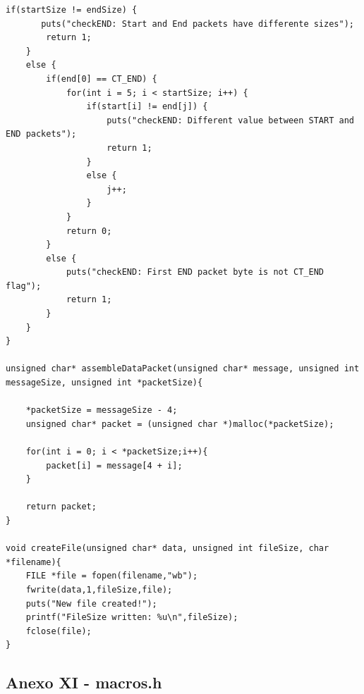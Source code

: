 \documentclass[11pt]{article}
\begin{document}
\begin{lstlisting}[style=CStyle]
    if(startSize != endSize) {
       puts("checkEND: Start and End packets have differente sizes");
        return 1;
    }
    else {
        if(end[0] == CT_END) {
            for(int i = 5; i < startSize; i++) {
                if(start[i] != end[j]) {
                    puts("checkEND: Different value between START and END packets");
                    return 1;
                }
                else {
                    j++;
                }  
            }
            return 0;
        }
        else {
            puts("checkEND: First END packet byte is not CT_END flag");
            return 1;
        }
    }
}

unsigned char* assembleDataPacket(unsigned char* message, unsigned int messageSize, unsigned int *packetSize){

    *packetSize = messageSize - 4;
    unsigned char* packet = (unsigned char *)malloc(*packetSize);

    for(int i = 0; i < *packetSize;i++){
        packet[i] = message[4 + i];
    }

    return packet;
}

void createFile(unsigned char* data, unsigned int fileSize, char *filename){
    FILE *file = fopen(filename,"wb");
    fwrite(data,1,fileSize,file);
    puts("New file created!");
    printf("FileSize written: %u\n",fileSize);
    fclose(file);
}

\end{lstlisting}

\pagebreak




\subsection{ Anexo XI - macros.h}
\end{document}
